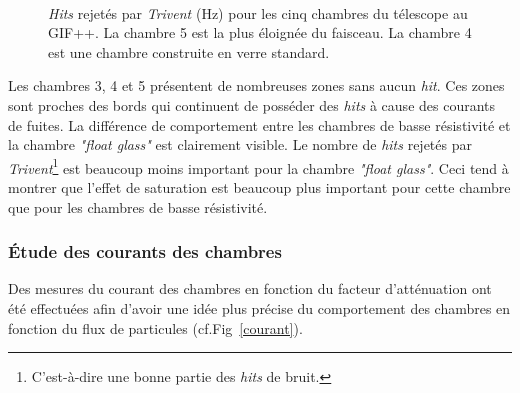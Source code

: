 \begin{figure}[ht!]
	\\
	\vspace{0.7cm}
	\caption{\textit{Hits} rejetés par \textit{Trivent} (\si{\hertz}) pour les cinq chambres du télescope au GIF++. La chambre \num{5} est la plus éloignée du faisceau. La chambre \num{4} est une chambre construite en verre standard.}
	\label{struc}
\end{figure}

Les chambres \num{3}, \num{4} et \num{5} présentent de nombreuses zones sans aucun \textit{hit}. Ces zones sont proches des bords qui continuent de posséder des \textit{hits} à cause des courants de fuites. La différence de comportement entre les chambres de basse résistivité et la chambre \textit{"float glass"} est clairement visible. Le nombre de \textit{hits} rejetés par \textit{Trivent}\footnote{C'est-à-dire une bonne partie des \textit{hits} de bruit.} est beaucoup moins important pour la chambre \textit{"float glass"}. Ceci tend à montrer que l'effet de saturation est beaucoup plus important pour cette chambre que pour les chambres de basse résistivité.

\subsubsection{Étude des courants des chambres}
Des mesures du courant des chambres en fonction du facteur d'atténuation ont été effectuées afin d'avoir une idée plus précise du comportement des chambres en fonction du flux de particules (cf.Fig~\ref{courant}).

